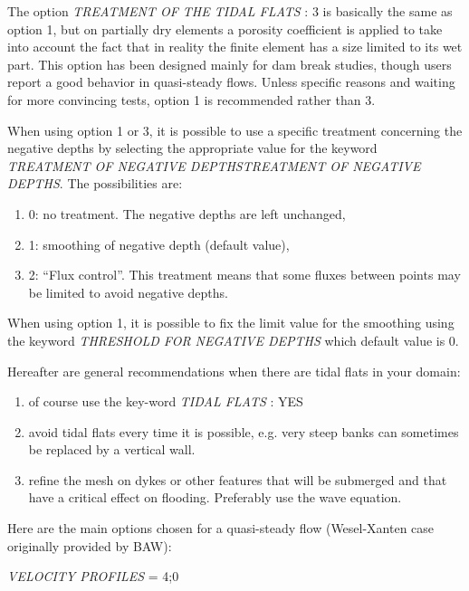  The option \textit{TREATMENT OF THE TIDAL FLATS} : 3 is basically the same as option 1, but on partially dry elements a porosity coefficient is applied to take into account the fact that in reality the finite element has a size limited to its wet part. This option has been designed mainly for dam break studies, though users report a good behavior in quasi-steady flows. Unless specific reasons and waiting for more convincing tests, option 1 is recommended rather than 3.

 When using option 1 or 3, it is possible to use a specific treatment concerning the negative depths by selecting the appropriate value for the keyword \textit{TREATMENT OF NEGATIVE DEPTHSTREATMENT OF NEGATIVE DEPTHS}. The possibilities are:

\begin{enumerate}
\item  0: no treatment. The negative depths are left unchanged,

\item  1: smoothing of negative depth (default value),

\item  2: ``Flux control''. This treatment means that some fluxes between points may be limited to avoid negative depths.
\end{enumerate}

 When using option 1, it is possible to fix the limit value for the smoothing using the keyword \textit{THRESHOLD FOR NEGATIVE DEPTHS} which default value is 0.

 Hereafter are general recommendations when there are tidal flats in your domain:

\begin{enumerate}
\item  of course use the key-word \textit{TIDAL FLATS }: YES

\item  avoid tidal flats every time it is possible, e.g. very steep banks can sometimes be replaced by a vertical wall.

\item  refine the mesh on dykes or other features that will be submerged and that have a critical effect on flooding. Preferably use the wave equation.
\end{enumerate}

 Here are the main options chosen for a quasi-steady flow (Wesel-Xanten case originally provided by BAW):

 \textit{VELOCITY PROFILES} = 4;0

